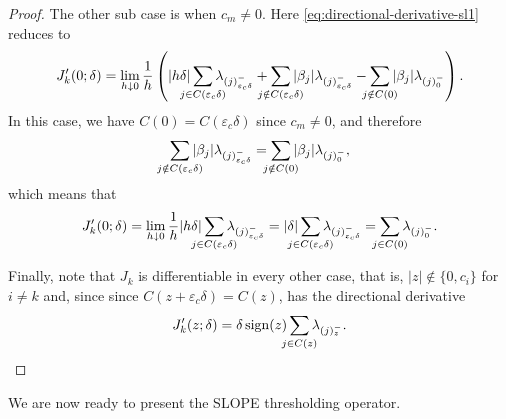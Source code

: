 \begin{proof}
 The other sub case is when \(c_m \neq 0\). Here \eqref{eq:directional-derivative-sl1} reduces to
  \begin{equation*}
    J_k'(0; \delta) = \lim_{h \downarrow 0}
    \frac{1}{h}
    \left(
      |h \delta| \smashoperator{\sum_{j \in C({\varepsilon_c}\delta)}} \lambda_{(j)^-_{{\varepsilon_c}\delta}}
      + \smashoperator{\sum_{j \notin C({\varepsilon_c}\delta)}} |\beta_j| \lambda_{(j)^-_{{\varepsilon_c}\delta}}
      - \smashoperator{\sum_{j \notin C(0)}} |\beta_j| \lambda_{(j)^-_{0}}
    \right).
  \end{equation*}
  In this case, we have \(C(0) = C({\varepsilon_c}\delta)\) since \(c_m \neq 0\), and therefore
  \[
    \smashoperator{\sum_{j \notin C({\varepsilon_c}\delta)}} |\beta_j| \lambda_{(j)^-_{{\varepsilon_c}\delta}}
    = \smashoperator{\sum_{j \notin C(0)}} |\beta_j| \lambda_{(j)^-_{0}},
  \]
  which means that
  \begin{equation*}
    J_k'(0; \delta) = \lim_{h \downarrow 0}
    \frac{1}{h}
    |h \delta| \smashoperator{\sum_{j \in C({\varepsilon_c}\delta)}} \lambda_{(j)^-_{{\varepsilon_c}\delta}}
    = |\delta|\smashoperator{\sum_{j \in C({\varepsilon_c}\delta)}} \lambda_{(j)^-_{{\varepsilon_c}\delta}}
    = \smashoperator{\sum_{j \in C(0)}} \lambda_{(j)^-_{0}}.
  \end{equation*}

  Finally, note that \(J_k\) is differentiable in every other case, that is,
  \(|z| \notin \{0, c_i\}\) for \(i \neq k\) and, since since \(C(z +
  {\varepsilon_c}\delta) = C(z)\), has the directional derivative
  \[
    J_k'(z; \delta) = \delta \sign(z) \smashoperator{\sum_{j \in C(z)}} \lambda_{(j)^-_{z}}.
  \]
\end{proof}

We are now ready to present the SLOPE thresholding operator.

